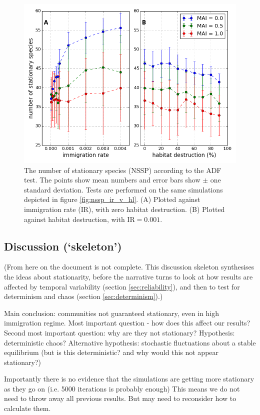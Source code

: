 \begin{figure}[h!]
	\centering
	\includegraphics[width=0.8\linewidth]{"./chapters/chapter04b/figures/nssp_v_ir_and_hl"}
    \caption{The number of stationary species (NSSP) according to the ADF test. The points show mean numbers and error bars show $\pm$ one standard deviation. Tests are performed on the same simulations depicted in figure \ref{fig:nssp_ir_v_hl}. (A) Plotted against immigration rate (IR), with zero habitat destruction. (B) Plotted against habitat destruction, with IR$=0.001$. }    
    \label{fig:nssp_v_ir_and_hl}
\end{figure}

\subsection{Discussion (`skeleton')}
\label{sec:stationarity_discussion}

(From here on the document is not complete. This discussion skeleton synthesises the ideas about stationarity, before the narrative turns to look at how results are affected by temporal variability (section \ref{sec:reliability}), and then to test for determinism and chaos (section \ref{sec:determinism}).)

Main conclusion: communities not guaranteed stationary, even in high immigration regime. Most important question - how does this affect our results?  Second most important question: why are they not stationary? Hypothesis: deterministic chaos? Alternative hypothesis: stochastic fluctuations about a stable equilibrium (but is this deterministic? and why would this not appear stationary?)

Importantly there is no evidence that the simulations are getting more stationary as they go on (i.e. 5000 iterations is probably enough) This means we do not need to throw away all previous results. But may need to reconsider how to calculate them.

